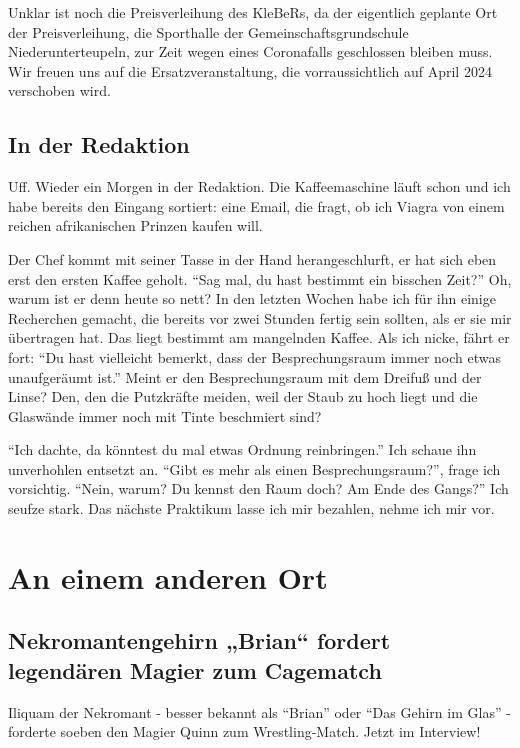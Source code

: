 \documentclass[final]{multiversum}
\begin{document}
Unklar ist noch die Preisverleihung des KleBeRs, da der eigentlich geplante Ort der Preisverleihung, die Sporthalle der Gemeinschaftsgrundschule Niederunterteupeln, zur Zeit wegen eines Coronafalls geschlossen bleiben muss.
Wir freuen uns auf die Ersatzveranstaltung, die vorraussichtlich auf April 2024 verschoben wird.

\subsection{In der Redaktion}
Uff. Wieder ein Morgen in der Redaktion.
Die Kaffeemaschine läuft schon und ich habe bereits den Eingang sortiert: 
eine Email, die fragt, ob ich Viagra von einem reichen afrikanischen Prinzen kaufen will.

Der Chef kommt mit seiner Tasse in der Hand herangeschlurft, er hat sich eben erst den ersten Kaffee geholt.
\enquote{Sag mal, du hast bestimmt ein bisschen Zeit?}
Oh, warum ist er denn heute so nett?
In den letzten Wochen habe ich für ihn einige Recherchen gemacht, die bereits vor zwei Stunden fertig sein sollten, als er sie mir übertragen hat.
Das liegt bestimmt am mangelnden Kaffee.
Als ich nicke, fährt er fort:
\enquote{Du hast vielleicht bemerkt, dass der Besprechungsraum immer noch etwas unaufgeräumt ist.}
Meint er den Besprechungsraum mit dem Dreifuß und der Linse?
Den, den die Putzkräfte meiden, weil der Staub zu hoch liegt und die Glaswände immer noch mit Tinte beschmiert sind?

 \enquote{Ich dachte, da könntest du mal etwas Ordnung reinbringen.}
 Ich schaue ihn unverhohlen entsetzt an.
 \enquote{Gibt es mehr als einen Besprechungsraum?}, frage ich vorsichtig.
 \enquote{Nein, warum? Du kennst den Raum doch? Am Ende des Gangs?}
 Ich seufze stark.
 Das nächste Praktikum lasse ich mir bezahlen, nehme ich mir vor.

\section{An einem anderen Ort}

\subsection{Nekromantengehirn „Brian“ fordert legendären Magier zum Cagematch}

Iliquam der Nekromant - besser bekannt als \enquote{Brian} oder \enquote{Das Gehirn im Glas} - forderte soeben den Magier Quinn zum Wrestling-Match. Jetzt im Interview! 
\end{document}
